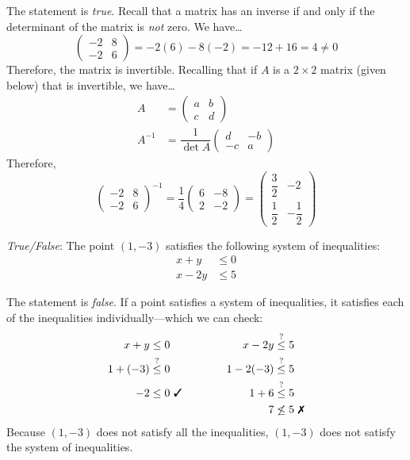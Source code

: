 \documentclass[11pt,letterpaper]{article}
\begin{document}
\sol The statement is \textit{true}. Recall that a matrix has an inverse if and only if the determinant of the matrix is \textit{not} zero. We have\dots
	\[
	\begin{pmatrix} -2 & 8 \\ -2 & 6 \end{pmatrix}= -2(6) - 8(-2)= -12 + 16= 4 \neq 0
	\]
Therefore, the matrix is invertible. Recalling that if $A$ is a $2 \times 2$ matrix (given below) that is invertible, we have\dots
	\[
	\begin{aligned}
	A&= 
	\begin{pmatrix}
	a & b \\ 
	c & d
	\end{pmatrix} \\
	A^{-1}&= \dfrac{1}{\det A}
	\begin{pmatrix}
	d & -b \\
	-c & a 
	\end{pmatrix}
	\end{aligned}
	\]
Therefore, 
	\[
	\begin{pmatrix} -2 & 8 \\ -2 & 6 \end{pmatrix}^{-1}= \dfrac{1}{4} \begin{pmatrix} 6 & -8 \\ 2 & -2 \end{pmatrix}= \begin{pmatrix} \dfrac{3}{2} & -2 \\[0.3cm] \dfrac{1}{2} & -\dfrac{1}{2} \end{pmatrix}
	\]



\newpage



\quizsol \textit{True/False}: The point $(1, -3)$ satisfies the following system of inequalities:
	\[
	\begin{aligned}
	x + y&\leq 0 \\
	x - 2y&\leq 5
	\end{aligned}
	\]

\sol The statement is \textit{false}. If a point satisfies a system of inequalities, it satisfies each of the inequalities individually---which we can check:
	\[
	\begin{aligned}
	x + y&\leq 0 && \qquad & x - 2y&\stackrel{?}{\leq} 5 \\
	1 + (-3)&\stackrel{?}{\leq} 0 && \qquad & 1 - 2(-3)&\stackrel{?}{\leq} 5 \\
	-2&\leq 0 \text{ \cmark} && \qquad & 1 + 6&\stackrel{?}{\leq} 5 \\
	&				    && \qquad & 7 &\not\leq 5 \text{ \xmark}
	\end{aligned}
	\]
Because $(1, -3)$ does not satisfy all the inequalities, $(1, -3)$ does not satisfy the system of inequalities. \pvspace{1.5cm}
\end{document}
